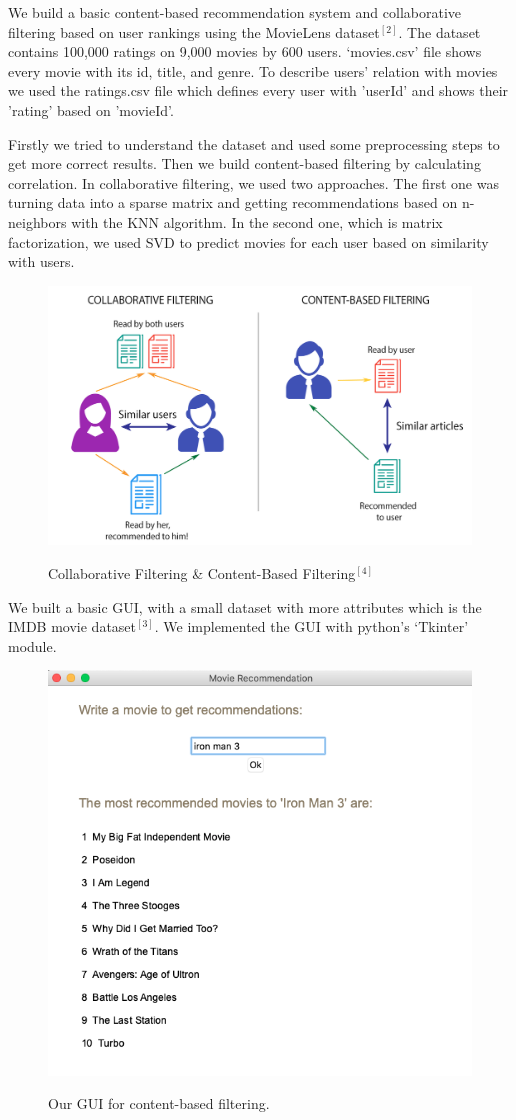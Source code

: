 \documentclass[onecolumn]{article}
\begin{document}
We build a basic content-based recommendation system and collaborative filtering based on user rankings using the MovieLens dataset${^{[2]}}.$ The dataset contains 100,000 ratings on 9,000 movies by 600 users.  ‘movies.csv’ file shows every movie with its id, title, and genre. To describe users' relation with movies we used the ratings.csv file which defines every user with 'userId' and shows their 'rating' based on 'movieId'.
\vspace{4mm}

Firstly we tried to understand the dataset and used some preprocessing steps to get more correct results. Then we build content-based filtering by calculating correlation.  In collaborative filtering, we used two approaches. The first one was turning data into a sparse matrix and getting recommendations based on n-neighbors with the KNN algorithm. In the second one, which is matrix factorization, we used SVD to predict movies for each user based on similarity with users.

\pagebreak

\begin{figure}[h!t]
\centering
{\centering
    \includegraphics[width=0.7\linewidth]{figures/figure2.png}}        
\caption{Collaborative Filtering \& Content-Based Filtering${^{[4]}}$}
\end{figure}

\hfill

We built a basic GUI, with a small dataset with more attributes which is the IMDB movie dataset${^{[3]}}$. We implemented the GUI with python’s ‘Tkinter’ module.

\begin{figure}[h!t]
\centering
{\centering
    \includegraphics[width=0.7\linewidth]{figures/gui.png}}        
\caption{Our GUI for content-based filtering.}
\end{figure}
\end{document}
